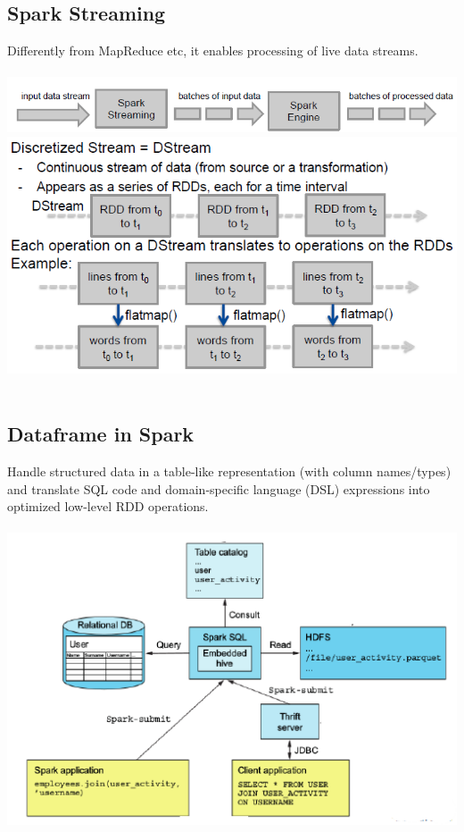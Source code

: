 \documentclass{article}
\begin{document}
\subsection{Spark Streaming}
Differently from MapReduce etc, it enables processing of live data streams.\\\\
\includegraphics[scale=0.6]{49.png}\\
\includegraphics[scale=0.6]{50.png}\\\\
\subsection{Dataframe in Spark}
Handle structured data in a table-like representation (with column names/types) and translate SQL code and domain-specific language (DSL) expressions into optimized low-level RDD operations.\\\\
\includegraphics[scale=0.6]{51.png}\\\\
\end{document}
